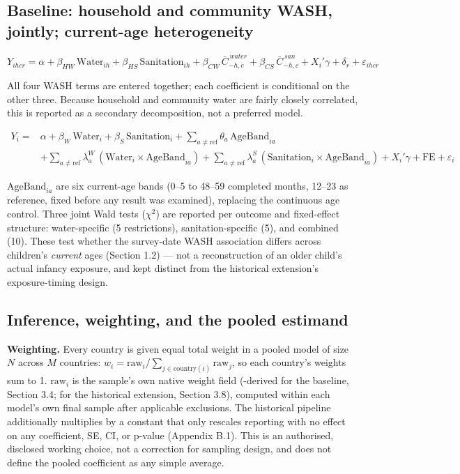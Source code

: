\subsection{Baseline: household and community WASH, jointly; current-age heterogeneity}\label{sec:4.4}

\[Y_{ihcr} = \alpha + \beta_{HW}\,\text{Water}_{ih} + \beta_{HS}\,\text{Sanitation}_{ih} + \beta_{CW}\,\bar{C}^{\,water}_{-h,c} + \beta_{CS}\,\bar{C}^{\,san}_{-h,c} + X_i'\gamma + \delta_r + \varepsilon_{ihcr}\]

All four WASH terms are entered together; each coefficient is conditional on the other three. Because household and community water are fairly closely correlated, this is reported as a secondary decomposition, not a preferred model.

\[\begin{aligned}
Y_i = {}& \alpha + \beta_W\,\text{Water}_i + \beta_S\,\text{Sanitation}_i + \sum_{a \neq \text{ref}} \theta_a\,\text{AgeBand}_{ia} \\
&+ \sum_{a \neq \text{ref}} \lambda^W_a\,(\text{Water}_i \times \text{AgeBand}_{ia}) + \sum_{a \neq \text{ref}} \lambda^S_a\,(\text{Sanitation}_i \times \text{AgeBand}_{ia}) + X_i'\gamma + \text{FE} + \varepsilon_i
\end{aligned}\]

\(\text{AgeBand}_{ia}\) are six current-age bands (0--5 to 48--59 completed months, 12--23 as reference, fixed before any result was examined), replacing the continuous age control. Three joint Wald tests (\(\chi^2\)) are reported per outcome and fixed-effect structure: water-specific (5 restrictions), sanitation-specific (5), and combined (10). These test whether the survey-date WASH association differs across children's \emph{current} ages (Section 1.2) --- not a reconstruction of an older child's actual infancy exposure, and kept distinct from the historical extension's exposure-timing design.

\subsection{Inference, weighting, and the pooled estimand}\label{sec:4.5}

\textbf{Weighting.} Every country is given equal total weight in a pooled model of size \(N\) across \(M\) countries: \(w_i = \text{raw}_i / \sum_{j \in \text{country}(i)} \text{raw}_j\), so each country's weights sum to 1. \(\text{raw}_i\) is the sample's own native weight field (-derived for the baseline, Section 3.4;  for the historical extension, Section 3.8), computed within each model's own final sample after applicable exclusions. The historical pipeline additionally multiplies by a constant that only rescales reporting with no effect on any coefficient, SE, CI, or p-value (Appendix B.1). This is an authorised, disclosed working choice, not a correction for sampling design, and does not define the pooled coefficient as any simple average.

